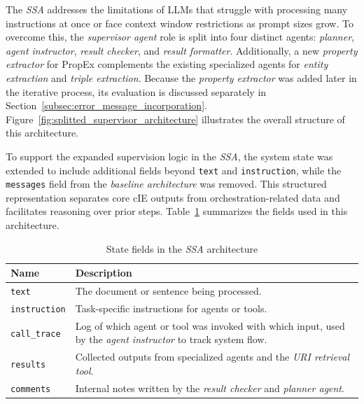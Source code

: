\documentclass[a4paper,oneside,bibliography=totoc]{scrbook}
\begin{document}
The \textit{\ac{SSA}} addresses the limitations of \acp{LLM} that struggle with processing many instructions at once or face context window restrictions as prompt sizes grow. To overcome this, the \textit{supervisor agent} role is split into four distinct agents: \textit{planner}, \textit{agent instructor}, \textit{result checker}, and \textit{result formatter}. Additionally, a new \textit{property extractor} for \ac{PropEx} complements the existing specialized agents for \textit{entity extraction} and \textit{triple extraction}. Because the \textit{property extractor} was added later in the iterative process, its evaluation is discussed separately in Section~\ref{subsec:error_message_incorporation}. Figure~\ref{fig:splitted_supervisor_architecture} illustrates the overall structure of this architecture.

To support the expanded supervision logic in the \textit{\ac{SSA}}, the system state was extended to include additional fields beyond \texttt{text} and \texttt{instruction}, while the \texttt{messages} field from the \textit{baseline architecture} was removed. This structured representation separates core \ac{cIE} outputs from orchestration-related data and facilitates reasoning over prior steps. Table~\ref{tab:ssa_state} summarizes the fields used in this architecture.

\begin{table}[h]
  \centering
  \caption{State fields in the \textit{\ac{SSA}} architecture}
  \label{tab:ssa_state}
  \begin{tabular}{p{3cm}p{10cm}}
    \toprule
    \textbf{Name}        & \textbf{Description}                                                                                                 \\
    \midrule
    \texttt{text}        & The document or sentence being processed.                                                                            \\
    \texttt{instruction} & Task-specific instructions for agents or tools.                                                                      \\
    \texttt{call\_trace} & Log of which agent or tool was invoked with which input, used by the \textit{agent instructor} to track system flow. \\
    \texttt{results}     & Collected outputs from specialized agents and the \textit{\ac{URI} retrieval tool}.                                  \\
    \texttt{comments}    & Internal notes written by the \textit{result checker} and \textit{planner agent}.                                    \\
    \bottomrule
  \end{tabular}
\end{table}
\end{document}
